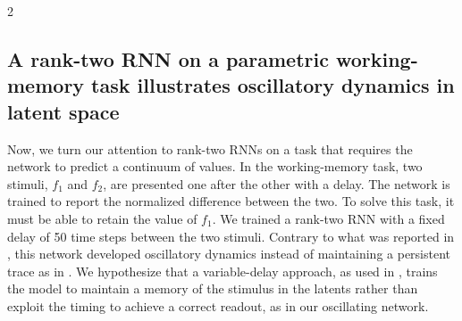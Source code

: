 \documentclass[10pt]{article}
\begin{document}
\begin{multicols}{2}
\subsection{A rank-two RNN on a parametric working-memory task illustrates oscillatory dynamics in latent space}

Now, we turn our attention to rank-two RNNs on a task that requires the network to predict a continuum of values. In the working-memory task, two stimuli, $f_1$ and $f_2$, are presented one after the other with a delay. The network is trained to report the normalized difference between the two. To solve this task, it must be able to retain the value of $f_1$. We trained a rank-two RNN with a fixed delay of 50 time steps between the two stimuli. Contrary to what was reported in \citet{dubreuil2022}, this network developed oscillatory dynamics instead of maintaining a persistent trace as in \citet{dubreuil2022}. We hypothesize that a variable-delay approach, as used in \citet{dubreuil2022}, trains the model to maintain a memory of the stimulus in the latents rather than exploit the timing to achieve a correct readout, as in our oscillating network.


\end{multicols}
\end{document}
